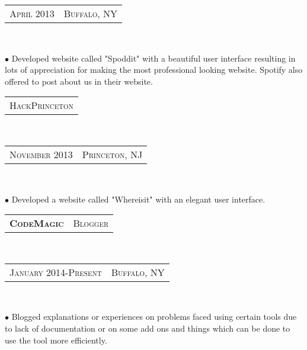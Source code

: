 \documentclass[10pt,letterpaper,oneside]{article}
\begin{document}
\begin{minipage}[t]{0.33\textwidth}
{\begin{tabular}{c|c}
                {\small A\textsc{pril 2013}}
                &{\small B\textsc{uffalo}, NY}
            \end{tabular}
        }\\
        \vspace{-12pt}
        \begin{adjustwidth}{7pt}{0pt}
            {\footnotesize  $\bullet$ Developed website called "Spoddit" with a beautiful user interface resulting in lots of appreciation for making the most professional looking website. Spotify also  offered to post about us in their website.}\\
        \end{adjustwidth}
        \vspace{-6pt}
        \begin{tabular}{c}
            {\small H\textsc{ack}P\textsc{rinceton}}
        \end{tabular}\\
        \textcolor{light-gray}{
            \begin{tabular}{c|c}
                {\small N\textsc{ovember 2013}}
                &{\small P\textsc{rinceton}, NJ}
            \end{tabular}
        }\\
        \vspace{-12pt}
        \begin{adjustwidth}{7pt}{0pt}
            {\footnotesize $\bullet$ Developed a website called "Whereisit" with an elegant user interface.}\\
        \end{adjustwidth}
        \begin{tabular}{c|c}
            \textbf{\normalsize C\textsc{ode}M\textsc{agic}}
            &\textmd{\normalsize B\textsc{logger}}
        \end{tabular}\\
        \textcolor{light-gray}{
            \begin{tabular}{c|c}
                {\small J\textsc{anuary 2014}-P\textsc{resent}}
                &{\small B\textsc{uffalo}, NY}
            \end{tabular}
        }\\ 
        \vspace{-4mm}
        \begin{adjustwidth}{7pt}{0pt}
            {\footnotesize $\bullet$ Blogged explanations or experiences on problems faced using certain tools due to lack
            of documentation or on some add ons and things which can be done to use the tool more efficiently.}\\

\end{adjustwidth}
\end{minipage}
\end{document}
